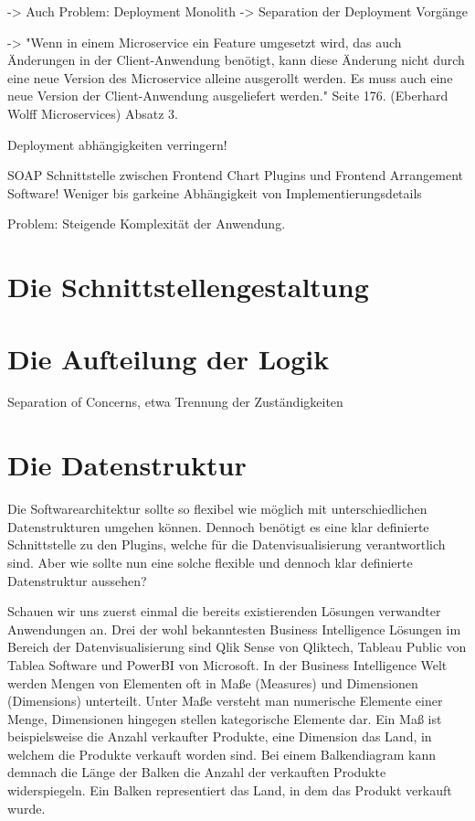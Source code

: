 -> Auch Problem: Deployment Monolith -> Separation der Deployment Vorgänge

-> "Wenn in einem Microservice ein Feature umgesetzt wird, das auch Änderungen
in der Client-Anwendung benötigt, kann diese Änderung nicht durch eine neue
Version des Microservice alleine ausgerollt werden. Es muss auch eine neue Version
der Client-Anwendung ausgeliefert werden." Seite 176.  (Eberhard Wolff Microservices)
Absatz 3.

Deployment abhängigkeiten verringern!

SOAP Schnittstelle zwischen Frontend Chart Plugins und Frontend Arrangement Software!
Weniger bis garkeine Abhängigkeit von Implementierungsdetails

Problem: Steigende Komplexität der Anwendung.

\section{Die Schnittstellengestaltung}

\section{Die Aufteilung der Logik}
\label{sec:die-aufteilung-der-logic}
Separation of Concerns, etwa Trennung der Zuständigkeiten

\section{Die Datenstruktur}
Die Softwarearchitektur sollte so flexibel wie möglich mit unterschiedlichen Datenstrukturen
umgehen können. Dennoch benötigt es eine klar definierte Schnittstelle zu den Plugins,
welche für die Datenvisualisierung verantwortlich sind. Aber wie sollte nun eine solche flexible 
und dennoch klar definierte Datenstruktur aussehen?

Schauen wir uns zuerst einmal die bereits existierenden Lösungen verwandter Anwendungen an. Drei der
wohl bekanntesten Business Intelligence Lösungen im Bereich der Datenvisualisierung sind Qlik Sense
von Qliktech, Tableau Public von Tablea Software und PowerBI von Microsoft. In der Business Intelligence
Welt werden Mengen von Elementen oft in Maße (Measures) und Dimensionen (Dimensions) unterteilt. Unter Maße versteht
man numerische Elemente einer Menge, Dimensionen hingegen stellen kategorische Elemente dar. Ein Maß
ist beispielsweise die Anzahl verkaufter Produkte, eine Dimension das Land, in welchem die Produkte verkauft worden
sind. Bei einem Balkendiagram kann demnach die Länge der Balken die Anzahl der verkauften Produkte
widerspiegeln. Ein Balken representiert das Land, in dem das Produkt verkauft wurde.


